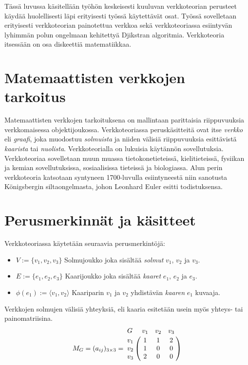 Tässä luvussa käsitellään työhön keskeisesti kuuluvan verkkoteorian perusteet käydää huolellisesti läpi erityisesti työssä käytettävät osat.
Työssä sovelletaan erityisesti verkkoteorian painotettua verkkoa sekä verkkoteoriassa esiintyvän lyhimmän polun ongelmaan kehitettyä Djikstran algoritmia.
Verkkoteoria itsessään on osa diskeettiä matematiikkaa.

\section{Matemaattisten verkkojen tarkoitus} \label{ch:09_matemaattisten_verkkojen_tarkoitus}

  Matemaattisten verkkojen tarkoituksena on mallintaan parittaisia riippuvuuksia verkkomaisessa objektijoukossa.
  Verkkoteoriassa peruskäsitteitä ovat itse \emph{verkko} eli \emph{graafi}, joka muodostuu \emph{solmuista} ja niiden välisiä riippuvuuksia esittävistä \emph{kaarista} tai \emph{nuolista}.
  Verkkoteorialla on lukuisia käytännön sovellutuksia. Verkkoteoriaa sovelletaan muun muassa tietokonetieteissä, kielitieteissä, fysiikan ja kemian sovellutuksissa, sosiaalisissa tieteissä ja biologiassa.
  Alun perin verkkoteoria katsotaan syntyneen 1700-luvulla esiintyneestä niin sanotusta Königsbergin siltaongelmasta, johon Leonhard Euler esitti todistuksensa.

\section{Perusmerkinnät ja käsitteet} \label{ch:09_perusmerkinnat_ja_kasitteet}

  Verkkoteoriassa käytetään seuraavia perusmerkintöjä:
  \begin{itemize}
    \item \(V := \{v_1, v_2, v_3\}\) Solmujoukko joka sisältää \emph{solmut} \(v_1\), \(v_2\) ja \(v_3\).
    \item \(E := \{e_1, e_2, e_3\}\) Kaarijoukko joka sisältää \emph{kaaret} \(e_1\), \(e_2\) ja \(e_3\).
    \item \(\phi(e_1) := \langle v_1, v_2 \rangle\) Kaariparin \(v_1\) ja \(v_2\) yhdistävän \emph{kaaren} \(e_1\) kuvaaja.
  \end{itemize}

  Verkkojen solmujen välisiä yhteyksiä, eli kaaria esitetään usein myös yhteys- tai painomatriisina.
  \[
    M_G = (a_{ij})_{3\times3} =
    \bordermatrix{
      G & v_1 & v_2 & v_3 \cr
      v_1 & 1 & 1 & 2 \cr
      v_2 & 1 & 0 & 0 \cr
      v_3 & 2 & 0 & 0 \cr
    }
  \]

